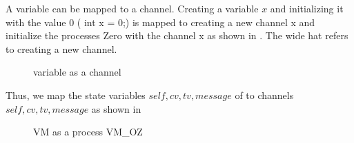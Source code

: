 A variable can be mapped to a channel. Creating a variable $x$ and initializing it with the value $0$ ( int x = 0;) is mapped to creating a new channel x and initialize the processes Zero with the channel x
as shown in . The wide hat refers to creating a new channel.
\begin{figure}[H]%
\centering
{}%
\hspace{1em}%
%
\caption{variable as a channel}
\label{tra_var}%
\end{figure}

Thus, we map the state variables $self, cv, tv, message$ of  to \picalc{} channels $self, cv, tv, message$ as shown in 

\begin{figure}[H]
\centering
{}
\caption{VM as a \picalc{} process VM\_OZ}
\label{tra_var2}
\end{figure}